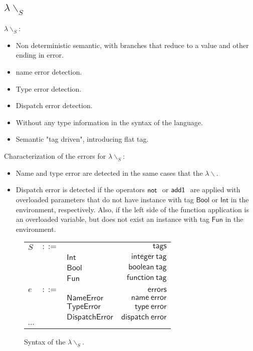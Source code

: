 \documentclass[preprint,authoryear,sort&compress,9pt,nocopyrightspace]{article}
\newcommand{\negacion}[1]{\mathsf{not} \ #1}
\newcommand{\suma}[1]{\mathsf{add1} \ #1}
\newcommand{\boolt}{\mathsf{Bool}}
\newcommand{\intt}{\mathsf{Int}}
\newcommand{\funt}{\mathsf{Fun}}
\newcommand{\nameerror}{\mathsf{NameError}}
\newcommand{\typeerror}{\mathsf{TypeError}}
\newcommand{\dispatcherror}{\mathsf{DispatchError}}
\newcommand{\semanticA}{$\lambda\backslash$}
\newcommand{\semanticB}{${\lambda}{\backslash}_S$}
\begin{document}
\subsection{\semanticB}
\semanticB:
\begin{itemize}\item Non deterministic semantic, with branches that reduce to a value and other ending in error.
\item name error detection.
\item Type error detection.
\item Dispatch error detection.
\item Without any type information in the syntax of the language.
\item Semantic "tag driven", introducing flat tag.
\end{itemize}
Characterization of the errors for \semanticB:
\begin{itemize}
\item Name and type error are detected in the same cases that the \semanticA.
\item Dispatch error is detected  if the operators $\negacion$ or $\suma$ are applied with overloaded parameters that do not have instance with tag $\boolt$ or $\intt$ in the environment, respectively. Also, if the left side of the function application is an overloaded variable, but does not exist an instance with tag $\funt$ in the environment.
\end{itemize}


\begin{figure}[h]
\begin{small}
\begin{center}
\begin{tabular}{|l c l r|}
\hline
$S$&$::=$&&$\mathsf {tags}$\\
&&$\intt$&$\mathsf {integer \ tag}$\\
&&$\boolt$&$\mathsf {boolean \ tag}$\\
&&$\funt$&$\mathsf {function \ tag}$\\
&&&\\
$e$&$::=$&&$\mathsf {errors}$\\
&&$\nameerror$&$\mathsf {name \ error}$\\
&&$\typeerror$&$\mathsf {type \ error}$\\
&&$\dispatcherror$&$\mathsf {dispatch \ error}$\\
$\cdots$&&&\\
\hline
\end{tabular}
\caption{Syntax of the \semanticB.}
\label{figure:syntax2}
\end{center}
\end{small}
\end{figure}
\end{document}
